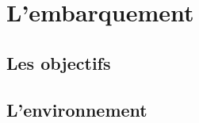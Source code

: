 \chapter{L'embarquement}

\blindtext[2] 

\section{Les objectifs}

\blindtext[2] 

\section{L'environnement}

\blindtext[2]
